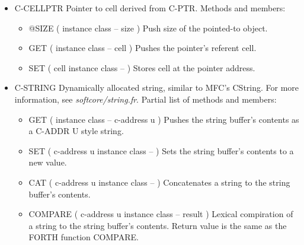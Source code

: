 \begin{;stlisting}[frame=single]
\begin{itemize}[noitemsep]
\begin{itemize}[noitemsep]
		\item GET ( instance class -- 4byte )\newline
		Pushes the pointer's referent 4byte.

		\item SET ( 4byte instance class -- )\newline
		Stores 4byte at the pointer address.
	\end{itemize}

	\item C-CELLPTR\newline
	Pointer to cell derived from C-PTR. Methods and members:
	\begin{itemize}[noitemsep]
		\item @SIZE ( instance class -- size )\newline
		Push size of the pointed-to object.

		\item GET ( instance class -- cell )\newline
		Pushes the pointer's referent cell.

		\item SET ( cell instance class -- )\newline
		Stores cell at the pointer address.
	\end{itemize}

	\item C-STRING\newline
	Dynamically allocated string, similar to MFC's CString. For more
	information, see \textit{softcore/string.fr}. Partial list of
	methods and members:
	\begin{itemize}[noitemsep]
		\item GET ( instance class -- c-address u )\newline
		Pushes the string buffer's contents as a C-ADDR U style
		string.

		\item SET ( c-address u instance class -- )\newline
		Sets the string buffer's contents to a new value.

		\item CAT ( c-address u instance class -- )\newline
		Concatenates a string to the string buffer's contents.

		\item COMPARE ( c-address u instance class -- result )\newline
		Lexical compiration of a string to the string buffer's
		contents. Return value is the same as the FORTH function
		COMPARE.


\end{itemize}
\end{itemize}
\end{;stlisting}
